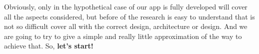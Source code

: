 \noindent Obviously, only in the hypothetical case of our app is fully developed will cover
all the aspects considered, but before of the research is easy to understand that
is not so difficult cover all with the correct design, architecture or design.
\intro
And we are going to try to give a simple and really little approximation of the way
to achieve that.
\intro
So, \textbf{let's start!}
